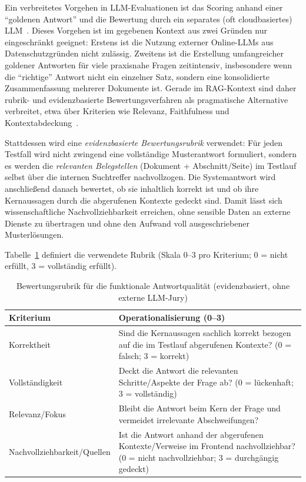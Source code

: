 Ein verbreitetes Vorgehen in LLM-Evaluationen ist das Scoring anhand einer \enquote{goldenen Antwort} und die Bewertung durch ein separates (oft cloudbasiertes) LLM~\cite{mtbench,geval}.
Dieses Vorgehen ist im gegebenen Kontext aus zwei Gründen nur eingeschränkt geeignet:
Erstens ist die Nutzung externer Online-LLMs aus Datenschutzgründen nicht zulässig.
Zweitens ist die Erstellung umfangreicher goldener Antworten für viele praxisnahe Fragen zeitintensiv, insbesondere wenn die \enquote{richtige} Antwort nicht ein einzelner Satz, sondern eine konsolidierte Zusammenfassung mehrerer Dokumente ist.
Gerade im RAG-Kontext sind daher rubrik- und evidenzbasierte Bewertungsverfahren als pragmatische Alternative verbreitet, etwa über Kriterien wie Relevanz, Faithfulness und Kontextabdeckung~\cite{ragas}.

Stattdessen wird eine \emph{evidenzbasierte Bewertungsrubrik} verwendet:
Für jeden Testfall wird nicht zwingend eine vollständige Musterantwort formuliert, sondern es werden die \emph{relevanten Belegstellen} (Dokument + Abschnitt/Seite) im Testlauf selbst über die internen Suchtreffer nachvollzogen.
Die Systemantwort wird anschließend danach bewertet, ob sie inhaltlich korrekt ist und ob ihre Kernaussagen durch die abgerufenen Kontexte gedeckt sind.
Damit lässt sich wissenschaftliche Nachvollziehbarkeit erreichen, ohne sensible Daten an externe Dienste zu übertragen und ohne den Aufwand voll ausgeschriebener Musterlösungen.

Tabelle~\ref{tab:eval-rubrik} definiert die verwendete Rubrik (Skala 0--3 pro Kriterium; 0 = nicht erfüllt, 3 = vollständig erfüllt).
\vspace{1cm}
\FloatBarrier
\begin{table}[htbp]
    \centering
    \small
    \begin{tabular}{p{3.6cm}p{9.6cm}}
        \toprule
        \textbf{Kriterium} & \textbf{Operationalisierung (0--3)} \\
        \midrule
        Korrektheit & Sind die Kernaussagen sachlich korrekt bezogen auf die im Testlauf abgerufenen Kontexte? (0 = falsch; 3 = korrekt) \\
        Vollständigkeit & Deckt die Antwort die relevanten Schritte/Aspekte der Frage ab? (0 = lückenhaft; 3 = vollständig) \\
        Relevanz/Fokus & Bleibt die Antwort beim Kern der Frage und vermeidet irrelevante Abschweifungen? \\
        Nachvollziehbarkeit/Quellen & Ist die Antwort anhand der abgerufenen Kontexte/Verweise im Frontend nachvollziehbar? (0 = nicht nachvollziehbar; 3 = durchgängig gedeckt) \\
        \bottomrule
    \end{tabular}
    \caption{Bewertungsrubrik für die funktionale Antwortqualität (evidenzbasiert, ohne externe LLM-Jury)}
    \label{tab:eval-rubrik}
\end{table}
\vspace{1cm}
\FloatBarrier
